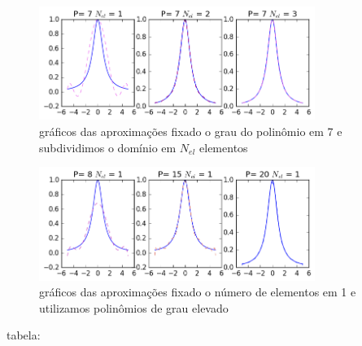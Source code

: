 \begin{figure}[!ht]
  \includegraphics[width=0.8\textwidth,center]{figuras/interp_usando_FEM.png}
  \caption{gráficos das aproximações fixado o grau do polinômio em 7 e subdividimos o domínio em $N_{el}$ elementos }
\end{figure}
\begin{figure}[!hb]
  \includegraphics[width=0.8\textwidth,center]{figuras/interp_usando_FEMfixo.png}
  \caption{gráficos das aproximações fixado o número de elementos em 1 e utilizamos polinômios de grau elevado}
\end{figure}
tabela:
